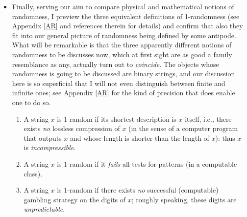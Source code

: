 \documentclass[12pt]{article}
\numberwithin{equation}{section}
\begin{document}
\begin{itemize}
  \item Finally, serving our aim to compare physical and mathematical notions of randomness, I preview the three equivalent definitions of 1-randomness (see Appendix \ref{AR} and references therein  for details) and confirm that also they  fit into our general picture of randomness being defined by some antipode. What will be remarkable is that the three apparently  different notions of randomness to be discusses now, which at first sight are as good a family resemblance as any, actually turn out to \emph{coincide}. The objects whose randomness is going to be discussed are  binary strings, and our discussion here is so superficial that I will not even distinguish between finite and infinite ones; see Appendix \ref{AR} for the kind of precision that does enable one to do so. 
  \begin{enumerate}
\item A string $x$ is 1-random if its shortest description is $x$ itself, i.e.,  there exists \emph{no} lossless compression of $x$ (in the sense of a computer program that outputs $x$ and whose length is shorter than the length of $x$): thus $x$ is \emph{incompressible}.
\item A string $x$ is 1-random if it \emph{fails} all tests for patterns (in a computable  class).
\item A string $x$ is 1-random if there exists \emph{no} successful (computable)  gambling strategy on the digits of $x$; 
roughly speaking, these digits are \emph{unpredictable}.
\end{enumerate}
  \end{itemize}
\end{document}
